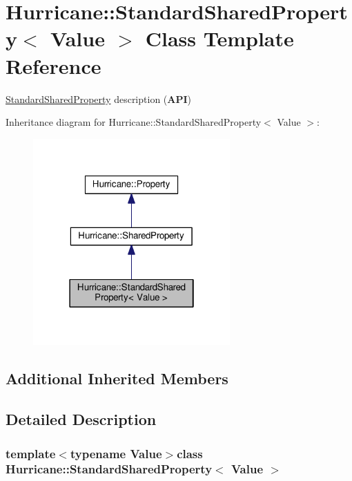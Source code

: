 \hypertarget{classHurricane_1_1StandardSharedProperty}{\section{Hurricane\-:\-:Standard\-Shared\-Property$<$ Value $>$ Class Template Reference}
\label{classHurricane_1_1StandardSharedProperty}
}


\hyperlink{classHurricane_1_1StandardSharedProperty}{Standard\-Shared\-Property} description ({\bfseries A\-P\-I})  




Inheritance diagram for Hurricane\-:\-:Standard\-Shared\-Property$<$ Value $>$\-:\nopagebreak
\begin{figure}[H]
\begin{center}
\leavevmode
\includegraphics[width=214pt]{classHurricane_1_1StandardSharedProperty__inherit__graph}
\end{center}
\end{figure}
\subsection*{Additional Inherited Members}


\subsection{Detailed Description}
\subsubsection*{template$<$typename Value$>$class Hurricane\-::\-Standard\-Shared\-Property$<$ Value $>$}

